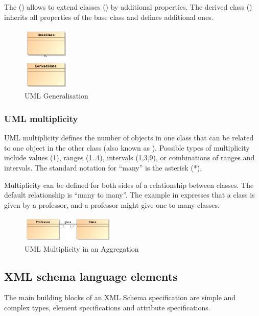 The  () allows to extend classes () by additional properties. The derived class () inherits all properties of the base class and defines additional ones.

\begin{figure}[h]
	\centering
	\includegraphics[width=0.2\textwidth]{images/pdf/umlGeneralisation}
	\caption{UML Generalisation}
	\label{fig:umlGeneralisation}
\end{figure}


\subsubsection{UML multiplicity}
UML multiplicity defines the number of objects in one class that can be related to one object in the other class (also known as ). Possible types of multiplicity include values (1), ranges (1$..$4), intervals (1,3,9), or combinations of ranges and intervals. The standard notation for ``many'' is the asterisk (*). 

Multiplicity can be defined for both sides of a relationship between classes. The default relationship is ``many to many''. The example in  expresses that a class is given by a professor, and a professor might give one to many classes.

\begin{figure}[h]
	\centering
	\includegraphics[width=0.4\textwidth]{images/pdf/umlMultiplicity}
	\caption{UML Multiplicity in an Aggregation}
	\label{fig:umlMulti}
\end{figure}


\subsection{XML schema language elements}
The main building blocks of an XML Schema specification are simple and complex types, element specifications and attribute specifications.


